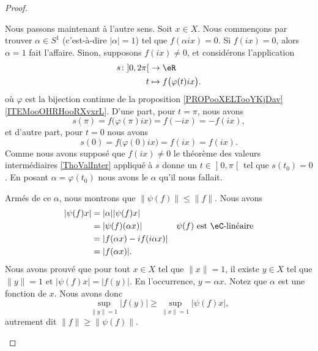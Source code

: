 \begin{proof}
\begin{subproof}
\begin{subproof}

			Nous passons maintenant à l'autre sens. Soit \( x\in X\). Nous commençons par trouver \( \alpha\in S^1\) (c'est-à-dire \( | \alpha |=1\)) tel que \( f(\alpha ix)=0\). Si \( f(ix)=0\), alors \( \alpha=1\) fait l'affaire. Sinon, supposons \( f(ix)\neq 0\), et considérons l'application
			\begin{equation}
				\begin{aligned}
					s\colon \mathopen] 0,2\pi\mathclose[ & \to \eR                            \\
					t                                    & \mapsto f\big( \varphi(t)ix \big).
				\end{aligned}
			\end{equation}
			où \( \varphi\) est la bijection continue de la proposition \ref{PROPooXELTooYKjDav}\ref{ITEMooOHRHooRXvxrL}. D'une part, pour \( t=\pi\), nous avons
			\begin{equation}
				s(\pi)=f\big( \varphi(\pi)ix \big)=f(-ix)=-f(ix),
			\end{equation}
			et d'autre part, pour \( t=0 \) nous avons
			\begin{equation}
				s(0)=f\big( \varphi(0)ix \big)=f(ix)=f(ix).
			\end{equation}
			Comme nous avons supposé que \( f(ix)\neq 0\) le théorème des valeurs intermédiaires \ref{ThoValInter} appliqué à \( s\) donne un \( t\in \mathopen] 0,\pi\mathclose[\) tel que \( s(t_0)=0\). En posant \( \alpha=\varphi(t_0)\) nous avons le \( \alpha\) qu'il nous fallait.

			Armés de ce \( \alpha\), nous montrons que \( \| \psi(f) \|\leq \| f \|\). Nous avons
			\begin{subequations}
				\begin{align}
					| \psi(f)x | & =| \alpha || \psi(f)x |                                                    \\
					             & =| \psi(f)(\alpha x) |         & \text{\( \psi(f)\) est \( \eC\)-linéaire} \\
					             & =| f(\alpha x)-if(i\alpha x) |                                             \\
					             & =| f(\alpha x) |.
				\end{align}
			\end{subequations}
			Nous avons prouvé que pour tout \( x\in X\) tel que \( \| x \|=1\), il existe \( y\in X\) tel que \( \| y \|=1\) et \( | \psi(f)x |=| f(y) |\). En l'occurrence, \( y=\alpha x\). Notez que \( \alpha\) est une fonction de \( x\). Nous avons donc
			\begin{equation}
				\sup_{\| y \|=1}| f(y) |\geq \sup_{\| x \|=1}| \psi(f)x |,
			\end{equation}
			autrement dit \( \| f \|\geq \| \psi(f) \|\).
		\end{subproof}


\end{subproof}
\end{proof}
